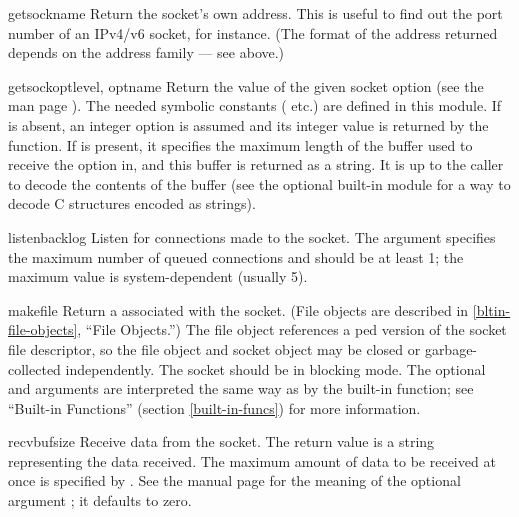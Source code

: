 \begin{methoddesc}[socket]{getsockname}{}
Return the socket's own address.  This is useful to find out the port
number of an IPv4/v6 socket, for instance.
(The format of the address returned depends on the address family ---
see above.)
\end{methoddesc}

\begin{methoddesc}[socket]{getsockopt}{level, optname}
Return the value of the given socket option (see the \UNIX{} man page
).  The needed symbolic constants
( etc.) are defined in this module.  If 
is absent, an integer option is assumed and its integer value
is returned by the function.  If  is present, it specifies
the maximum length of the buffer used to receive the option in, and
this buffer is returned as a string.  It is up to the caller to decode
the contents of the buffer (see the optional built-in module
 for a way to decode C structures encoded as strings).
\end{methoddesc}

\begin{methoddesc}[socket]{listen}{backlog}
Listen for connections made to the socket.  The  argument
specifies the maximum number of queued connections and should be at
least 1; the maximum value is system-dependent (usually 5).
\end{methoddesc}

\begin{methoddesc}[socket]{makefile}{}
Return a  associated with the socket.  (File objects
are described in \ref{bltin-file-objects}, ``File Objects.'')
The file object references a ped version of the
socket file descriptor, so the file object and socket object may be
closed or garbage-collected independently.
The socket should be in blocking mode.
The optional 
and  arguments are interpreted the same way as by the
built-in  function; see ``Built-in Functions''
(section \ref{built-in-funcs}) for more information.
\end{methoddesc}

\begin{methoddesc}[socket]{recv}{bufsize}
Receive data from the socket.  The return value is a string representing
the data received.  The maximum amount of data to be received
at once is specified by .  See the \UNIX{} manual page
 for the meaning of the optional argument
; it defaults to zero.
\end{methoddesc}

